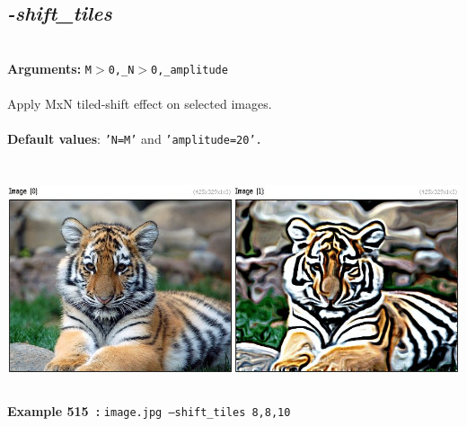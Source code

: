 \documentclass[a4paper,11pt,twoside]{book}
\begin{document}
\subsection{\emph{-shift\_tiles} }\vspace*{-0.5em}
~\\\textbf{Arguments: } 
{\small \texttt{M$>$0,\_N$>$0,\_amplitude}}\\~\\
Apply MxN tiled-shift effect on selected images.
~\\~\\\textbf{Default values}: {\small \texttt{'N=M'} and \texttt{'amplitude=20'.}}
\begin{center}\includegraphics[keepaspectratio=true,height=7cm,width=\textwidth]{img/gmic_def515.jpg}\\
{\footnotesize \textbf{Example 515~:} \texttt{image.jpg --shift\_tiles 8,8,10}}
\end{center}
\end{document}
